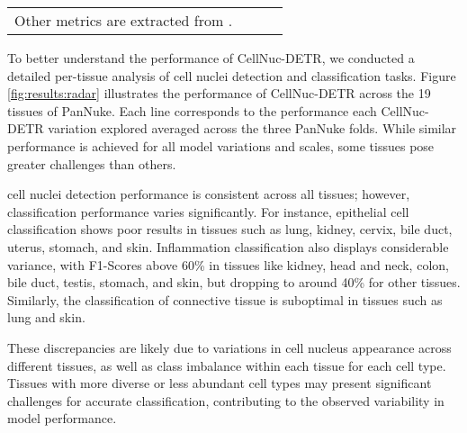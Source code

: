 \begin{table}[ht]
\begin{adjustbox}{width=\textwidth}
\begin{tabular}{l|ccc|ccc|ccc|ccc|ccc|cccccc}

\bottomrule
\multicolumn{19}{l}{\small Other metrics are extracted from \cite{hörst2023cellvit}.}

\end{tabular}
\end{adjustbox}
\vskip -0.1in
\end{table}

To better understand the performance of CellNuc-DETR, we conducted a detailed per-tissue analysis of cell nuclei detection and classification tasks. Figure \ref{fig:results:radar} illustrates the performance of CellNuc-DETR across the 19 tissues of PanNuke. Each line corresponds to the performance each CellNuc-DETR variation explored averaged across the three PanNuke folds. While similar performance is achieved for all model variations and scales, some tissues pose greater challenges than others.

cell nuclei detection performance is consistent across all tissues; however, classification performance varies significantly. For instance, epithelial cell classification shows poor results in tissues such as lung, kidney, cervix, bile duct, uterus, stomach, and skin. Inflammation classification also displays considerable variance, with F1-Scores above 60\% in tissues like kidney, head and neck, colon, bile duct, testis, stomach, and skin, but dropping to around 40\% for other tissues. Similarly, the classification of connective tissue is suboptimal in tissues such as lung and skin.

These discrepancies are likely due to variations in cell nucleus appearance across different tissues, as well as class imbalance within each tissue for each cell type. Tissues with more diverse or less abundant cell types may present significant challenges for accurate classification, contributing to the observed variability in model performance.

